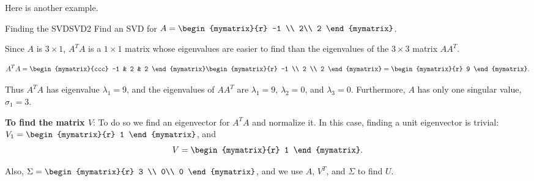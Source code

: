 Here is another example. 

\begin{example}{Finding the SVD}{SVD2}
Find an SVD for
$A=\begin{mymatrix}{r} -1 \\ 2\\ 2 \end{mymatrix}$.
\end{example}

\begin{solution}
Since $A$ is $3\times 1$, $A^T A$ is a $1\times 1$ matrix
whose eigenvalues are easier to find than the eigenvalues of
the $3\times 3$ matrix $AA^T$.

\[ A^TA=\begin{mymatrix}{ccc} -1 & 2 & 2 \end{mymatrix}
\begin{mymatrix}{r} -1 \\ 2 \\ 2 \end{mymatrix}
=\begin{mymatrix}{r} 9 \end{mymatrix}.\]

Thus $A^TA$ has eigenvalue $\lambda_1=9$, and
the eigenvalues of $AA^T$ are $\lambda_1=9$, $\lambda_2=0$, and
$\lambda_3=0$. 
Furthermore, $A$ has only one singular value, $\sigma_1=3$.

{\bf To find the matrix $V$}:
To do so we find an eigenvector for $A^TA$ and
normalize it.
In this case, finding a unit eigenvector is trivial:
$V_1=\begin{mymatrix}{r} 1 \end{mymatrix}$, and
\[ V=\begin{mymatrix}{r} 1 \end{mymatrix}.\]

Also,
$\Sigma =\begin{mymatrix}{r} 3 \\ 0\\ 0 \end{mymatrix}$,
and we use $A$, $V^T$, and $\Sigma$ to find $U$.



\end{solution}
